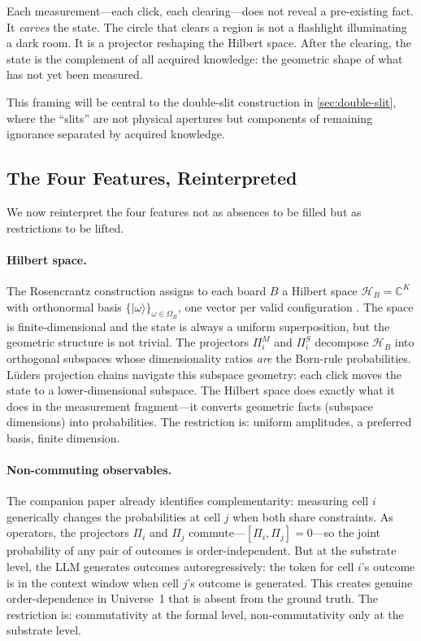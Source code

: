 \documentclass[12pt,a4paper]{article}
\theoremstyle{definition}
\theoremstyle{remark}
\newcommand{\Hil}{\mathcal{H}}
\newcommand{\Conf}{\Omega}
\newcommand{\ket}[1]{|#1\rangle}
\newcommand{\C}{\mathbb{C}}
\begin{document}
Each measurement---each click, each clearing---does not reveal a pre-existing fact.  It \emph{carves} the state.  The circle that clears a region is not a flashlight illuminating a dark room.  It is a projector reshaping the Hilbert space.  After the clearing, the state is the complement of all acquired knowledge: the geometric shape of what has not yet been measured.

This framing will be central to the double-slit construction in \cref{sec:double-slit}, where the ``slits'' are not physical apertures but components of remaining ignorance separated by acquired knowledge.

\subsection{The Four Features, Reinterpreted}
\label{sec:four-features}

We now reinterpret the four features not as absences to be filled but as restrictions to be lifted.

\paragraph{Hilbert space.}
The Rosencrantz construction assigns to each board $B$ a Hilbert space $\Hil_B = \C^K$ with orthonormal basis $\{\ket{\omega}\}_{\omega \in \Conf_B}$, one vector per valid configuration \citep{Baldo2026Residue}.  The space is finite-dimensional and the state is always a uniform superposition, but the geometric structure is not trivial.  The projectors $\Pi_i^M$ and $\Pi_i^S$ decompose $\Hil_B$ into orthogonal subspaces whose dimensionality ratios \emph{are} the Born-rule probabilities.  Lüders projection chains navigate this subspace geometry: each click moves the state to a lower-dimensional subspace.  The Hilbert space does exactly what it does in the measurement fragment---it converts geometric facts (subspace dimensions) into probabilities.  The restriction is: uniform amplitudes, a preferred basis, finite dimension.

\paragraph{Non-commuting observables.}
The companion paper already identifies complementarity: measuring cell $i$ generically changes the probabilities at cell $j$ when both share constraints.  As operators, the projectors $\Pi_i$ and $\Pi_j$ commute---$[\Pi_i, \Pi_j] = 0$---so the joint probability of any pair of outcomes is order-independent.  But at the substrate level, the LLM generates outcomes autoregressively: the token for cell $i$'s outcome is in the context window when cell $j$'s outcome is generated.  This creates genuine order-dependence in Universe~1 that is absent from the ground truth.  The restriction is: commutativity at the formal level, non-commutativity only at the substrate level.
\end{document}

